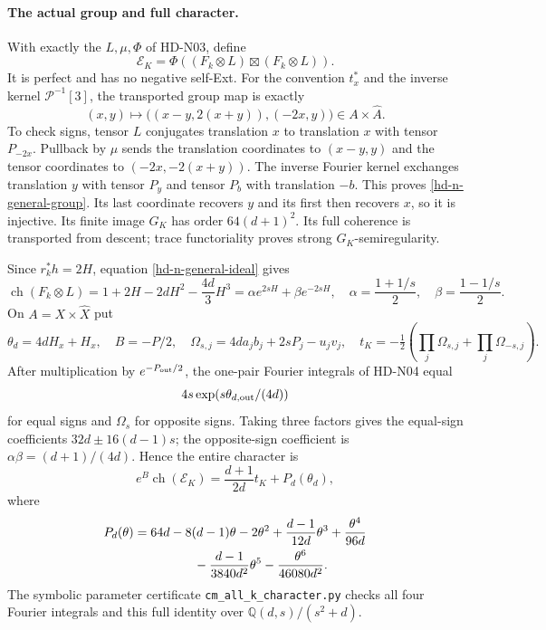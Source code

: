\paragraph{The actual group and full character.}
With exactly the $L,\mu,\Phi$ of HD-N03, define
\[
 \mathcal E_K=\Phi((F_k\otimes L)\boxtimes(F_k\otimes L)).
\]
It is perfect and has no negative self-Ext. For the convention $t_x^*$
and the inverse kernel $\mathcal P^{-1}[3]$, the transported group map
is exactly
\begin{equation}\label{hd-n-general-group}
 (x,y)\longmapsto
 \bigl((x-y,2(x+y)),(-2x,y)\bigr)
 \in A\times\widehat A.
\end{equation}
To check signs, tensor $L$ conjugates translation $x$ to translation
$x$ with tensor $P_{-2x}$. Pullback by $\mu$ sends the translation
coordinates to $(x-y,y)$ and the tensor coordinates to
$(-2x,-2(x+y))$. The inverse Fourier kernel exchanges translation
$y$ with tensor $P_y$ and tensor $P_b$ with translation $-b$.
This proves \eqref{hd-n-general-group}. Its last coordinate recovers
$y$ and its first then recovers $x$, so it is injective. Its finite
image $G_K$ has order $64(d+1)^2$. Its full coherence is transported
from descent; trace functoriality proves strong $G_K$-semiregularity.

Since $r_k^*h=2H$, equation \eqref{hd-n-general-ideal} gives
\[
 \operatorname{ch}(F_k\otimes L)
 =1+2H-2dH^2-\frac{4d}{3}H^3
 =\alpha e^{2sH}+\beta e^{-2sH},\quad
 \alpha=\frac{1+1/s}{2},\quad\beta=\frac{1-1/s}{2}.
\]
On $A=X\times\widehat X$ put
\[
 \theta_d=4dH_x+H_{\widehat x},\quad B=-P/2,\quad
 \Omega_{s,j}=4da_jb_j+2sP_j-u_jv_j,\quad
 t_K=-\tfrac12\left(\prod_j\Omega_{s,j}
                         +\prod_j\Omega_{-s,j}\right).
\]
After multiplication by $e^{-P_{\rm out}/2}$, the one-pair
Fourier integrals of HD-N04 equal
\[4s\exp(s\theta_{d,\rm out}/(4d))\]
for equal signs and
$\Omega_s$ for opposite signs. Taking three factors gives the
equal-sign coefficients $32d\pm16(d-1)s$; the opposite-sign coefficient
is $\alpha\beta=(d+1)/(4d)$. Hence the entire character is
\begin{equation}\label{hd-n-general-character}
 e^B\operatorname{ch}(\mathcal E_K)
 =\frac{d+1}{2d}t_K+P_d(\theta_d),
\end{equation}
where
\begin{align*}
 P_d(\theta)={}&64d-8(d-1)\theta-2\theta^2
       +\frac{d-1}{12d}\theta^3+\frac{\theta^4}{96d}\\
 &\hspace{12mm}-\frac{d-1}{3840d^2}\theta^5
       -\frac{\theta^6}{46080d^2}.
\end{align*}
The symbolic parameter certificate
\texttt{cm\_all\_k\_character.py} checks all four Fourier integrals
and this full identity over $\mathbb Q(d,s)/(s^2+d)$.


